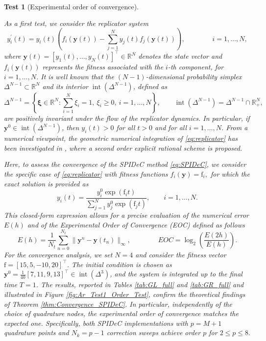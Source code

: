 \documentclass[a4paper,num-refs]{oup-contemporary-spidec}
\newtheorem{testcase}{Test} %
\begin{document}
\begin{testcase}[Experimental order of convergence]\label{test:Convergence}

As a first test, we consider the replicator system
\begin{equation}\label{eq:replicator}
    y_i^\prime(t) = y_i(t)\left( f_i(\bm{y}(t)) - \sum_{j=1}^{N} y_j(t) f_j(\bm{y}(t)) \right),\qquad \qquad i=1,\dots,N,
\end{equation}
where $\bm{y}(t)=[y_1(t),\dots,y_N(t)]^\top\in \mathbb{R}^N$ denotes the state vector and $f_i(\bm{y}(t))$ represents the fitness associated with the $i$-th component, for $i=1,\dots,N$.
It is well known that the $(N-1)$-dimensional probability simplex $\Delta^{N-1}\subset \mathbb{R}^N$ and its interior $\operatorname{int}(\Delta^{N-1})$, defined as
\begin{equation*}
    \Delta^{N-1} = \left\{\bm{\xi} \in \mathbb{R}^N : \sum_{i=1}^{N}\xi_i = 1,\ \xi_i \ge 0,\ i=1,\dots,N \right\}, \qquad \operatorname{int}(\Delta^{N-1})= \Delta^{N-1}\cap \mathbb{R}^N_+,
\end{equation*}
are positively invariant under the flow of the replicator dynamics. In particular, if $\bm{y}^0 \in \operatorname{int}(\Delta^{N-1})$, then $y_i(t) > 0$ for all $t > 0$ and for all $i=1,\dots,N$.
From a numerical viewpoint, the geometric numerical integration of \eqref{eq:replicator} has been investigated in \cite{Replicator_Pezzella}, where a second order explicit rational scheme is proposed. 

Here, to assess the convergence of the SPIDeC method \eqref{eq:SPIDeC}, we consider the specific case of \eqref{eq:replicator} with fitness functions $f_i(\bm{y})=\mathrm{f}_i,$ for which the exact solution is provided as 
\begin{equation}\label{eq:exact_sol}
    y_i(t) = \frac{y_i^0 \exp(\mathrm{f}_i t)}{\sum_{j=1}^{N} y_j^0 \exp(\mathrm{f}_j t)}, \qquad i=1,\dots,N.
\end{equation}
This closed-form expression allows for a precise evaluation of the numerical error $E(h)$ and of the Experimental Order of Convergence (EOC) defined as follows
\begin{equation*}
    E(h)=\dfrac{1}{N_t}\sum_{n=0}^{N_t}\|\bm{y}^n-\bm{y}(t_n)\|_\infty, \qquad \qquad EOC=\log_2\left(\dfrac{E(2h)}{E(h)}\right).
\end{equation*}
For the convergence analysis, we set $N=4$ and consider the fitness vector $\bm{\mathrm{f}} = [15, 5, -10, 20]^\top$. The initial condition is chosen as $\bm{y}^0 = \frac{1}{40}[7, 11, 9, 13]^\top \in \operatorname{int}(\Delta^3)$, and the system is integrated up to the final time $T=1$. The results, reported in Tables \ref{tab:GL_full} and \ref{tab:GR_full} and illustrated in Figure \ref{fig:Ar_Test1_Order_Test}, confirm the theoretical findings of Theorem \ref{thm:Convergence_SPIDeC}. In particular, independently of the choice of quadrature nodes, the experimental order of convergence matches the expected one. Specifically, both SPIDeC implementations with $p=M+1$ quadrature points and $N_k=p-1$ correction sweeps achieve order $p$ for $2\leq p \leq 8.$


\end{testcase}
\end{document}
